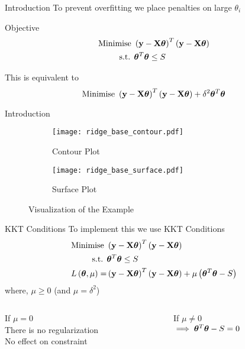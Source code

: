\documentclass{beamer}
\begin{document}
\begin{frame}{Introduction}
\vspace{0.4cm}
To prevent overfitting we place penalties on large $\theta_i$
\pause
 \\ \bigskip
\begin{tcolorbox}{Objective}
\begin{align*}
\text{Minimise } & \left(\mathbf{y}-\mathbf{X}\boldsymbol{\theta}\right)^T\left(\mathbf{y}-\mathbf{X}\boldsymbol{\theta}\right) \\
\text{s.t. } & \boldsymbol{\theta} ^T\boldsymbol{\theta} \leq S
\end{align*}
\end{tcolorbox}
\pause
This is equivalent to \vspace{-0.4cm}
$$
\text{Minimise } \left(\mathbf{y}-\mathbf{X}\boldsymbol{\theta}\right)^T\left(\mathbf{y}-\mathbf{X}\boldsymbol{\theta}\right) + \delta ^2\boldsymbol{\theta} ^T\boldsymbol{\theta}
$$
\end{frame}  

\begin{frame}{Introduction}
\begin{figure}
        \begin{subfigure}[b]{0.5\textwidth}
                \texttt{[image: ridge\_base\_contour.pdf]}
                \caption{Contour Plot}
        \end{subfigure}%
        \begin{subfigure}[b]{0.5\textwidth}
                \texttt{[image: ridge\_base\_surface.pdf]}
                \caption{Surface Plot}
        \end{subfigure}%
        \caption{Visualization of the Example}
\end{figure}
\end{frame}

\begin{frame}{KKT Conditions}
To implement this we use KKT Conditions
\pause
\begin{align*}
\text{Minimise } & \left(\mathbf{y}-\mathbf{X}\boldsymbol{\theta}\right)^T\left(\mathbf{y}-\mathbf{X}\boldsymbol{\theta}\right) \\
\text{s.t. } & \boldsymbol{\theta} ^T\boldsymbol{\theta} \leq S \\
L\left(\boldsymbol{\theta}, \mu \right) =& \left(\mathbf{y}-\mathbf{X}\boldsymbol{\theta}\right)^T\left(\mathbf{y}-\mathbf{X}\boldsymbol{\theta}\right) + \mu\left(\boldsymbol{\theta}^T\boldsymbol{\theta} - S\right)
\end{align*}
where, $\mu \geq 0$ (and $\mu = \delta^2$)\bigskip

\pause
\begin{columns}
\begin{column}{0.4\textwidth}
If $\mu = 0$ \\
There is no regularization \\
No effect on constraint
\end{column}
\pause
\begin{column}{0.4\textwidth}
If $\mu\neq 0$ \\
$\implies \boldsymbol{\theta}^T\boldsymbol{\theta} - S = 0$ 
\end{column}
\end{columns}
\end{frame}
\end{document}
